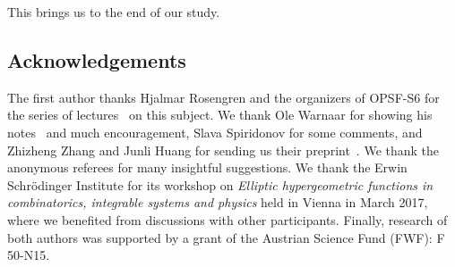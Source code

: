 \documentclass[pdftex]{sigma}
\numberwithin{equation}{section}
\begin{document}
This brings us to the end of our study.

\subsection*{Acknowledgements} The first author thanks Hjalmar Rosengren and the organizers of OPSF-S6 for the series of lectures~\cite{HR2016-lectures} on this subject. We thank Ole Warnaar for showing his notes~\cite{SOW-notes-2016} and much encouragement, Slava Spiridonov for some comments, and Zhizheng Zhang and Junli Huang for sending us their preprint~\cite{ZH-preprint}. We thank the anonymous referees for many insightful suggestions. We thank the Erwin Schr\"{o}dinger Institute for its workshop on {\em Elliptic hypergeometric functions in combinatorics, integrable systems and physics} held in Vienna in March 2017, where we benefited from discussions with other participants. Finally, research of both authors was supported by a grant of the Austrian Science Fund (FWF): F 50-N15.
\end{document}
